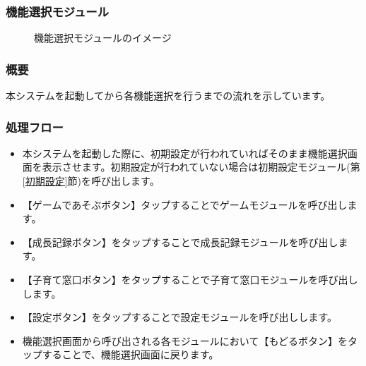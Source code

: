 \documentclass[a4j]{jarticle}
\begin{document}
\subsubsection{機能選択モジュール\label{機能選択}}
\begin{figure}[H]
    \begin{center}
    \caption {機能選択モジュールのイメージ}
    \label{functionselection}
    \end{center}
\end{figure}

\subsubsection*{概要}
本システムを起動してから各機能選択を行うまでの流れを示しています。

\subsubsection*{処理フロー}
\begin{itemize}
\item 本システムを起動した際に、初期設定が行われていればそのまま機能選択画面を表示させます。初期設定が行われていない場合は初期設定モジュール(第\ref{初期設定}節)を呼び出します。

\item 【ゲームであそぶボタン】タップすることでゲームモジュールを呼び出します。

\item 【成長記録ボタン】をタップすることで成長記録モジュールを呼び出します。

\item 【子育て窓口ボタン】をタップすることで子育て窓口モジュールを呼び出しします。

\item 【設定ボタン】をタップすることで設定モジュールを呼び出しします。

\item 機能選択画面から呼び出される各モジュールにおいて【もどるボタン】をタップすることで、機能選択画面に戻ります。
\end{itemize}
\end{document}
